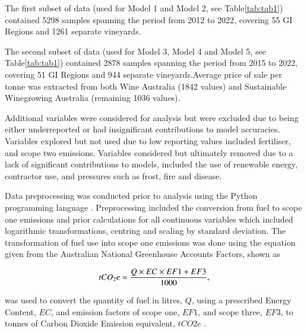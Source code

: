 \documentclass[review,12pt,authoryear]{elsarticle}
\begin{document}
\begin{linenumbers}
\par
The first subset of data (used for Model 1 and Model 2, see Table\ref{tab:tab1}) contained 5298 samples spanning the period from 2012 to 2022, covering 55 GI Regions and 1261 separate vineyards.
\par
The second subset of data (used for Model 3, Model 4 and Model 5, see Table\ref{tab:tab1}) contained 2878 samples spanning the period from 2015 to 2022, covering 51 GI Regions and 944 separate vineyards.Average price of sale per tonne was extracted from both Wine Australia (1842 values) and Sustainable Winegrowing Australia (remaining 1036 values).
\par
Additional variables were considered for analysis but were excluded due to being either underreported or had insignificant contributions to model accuracies. Variables explored but not used due to low reporting values included fertiliser, and scope two emissions. Variables considered but ultimately removed due to a lack of significant contributions to models, included the use of renewable energy, contractor use, and pressures such as frost, fire and disease.
\par
Data preprocessing was conducted prior to analysis using the Python programming language \citep{g.vanrossumPythonTutorialTechnical1995}. Preprocessing included the conversion from fuel to scope one emissions and prior calculations for all continuous variables which included logarithmic transformations, centring and scaling by standard deviation. The transformation of fuel use into scope one emissions was done using the equation given from the Australian National Greenhouse Accounts Factors, shown as
\par
\begin{equation}
\label{(1)}
    tCO_{2}e={{Q \times EC \times EF1 + EF3}\over{1000}},
\end{equation}
\par
was used to convert the quantity of fuel in litres, $Q$, using a prescribed Energy Content, $EC$, and emission factors of scope one, $EF1$, and scope three, $EF3$, to tonnes of Carbon Dioxide Emission equivalent, $tCO2e$ \citep{departmentofclimatechangeenergytheenvironmentandwaterAustralianNationalGreenhouse2022}.
\newline



\end{linenumbers}
\end{document}
